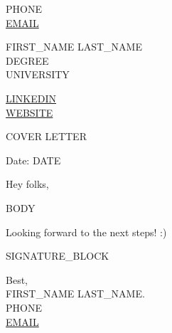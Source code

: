 \documentclass[12pt,a4paper]{article}
\begin{document}
\begin{center}
    \begin{minipage}[b]{0.24\textwidth}
            \large {{PHONE}} \\
            \large \href{mailto:{{EMAIL}}}{{{EMAIL}}}
    \end{minipage}%
    \begin{minipage}[b]{0.5\textwidth}
            \centering
            {\Huge {{FIRST_NAME}} {{LAST_NAME}}} \\ %
            \vspace{0.1cm}
            {\color{UI_blue} \large{{{DEGREE}} \\ {{UNIVERSITY}}}} \\
    \end{minipage}%
    \begin{minipage}[b]{0.24\textwidth}
            \flushright \large
            {\href{https://{{LINKEDIN}}}{{{LINKEDIN}}} } \\
            \href{https://{{WEBSITE}}}{{{WEBSITE}}}
    \end{minipage}

\vspace{-0.15cm}
{\color{UI_blue} \hrulefill}
\end{center}

\justify
\setlength{\parindent}{0pt}
\setlength{\parskip}{12pt}
\vspace{0.2cm}
\begin{center}
    {\color{UI_blue} \Large{COVER LETTER}}
\end{center}


\vspace{0.5cm}

Date: {{DATE}} \par \vspace{-0.1cm}

Hey folks,

{{BODY}}

Looking forward to the next steps! :)

{{SIGNATURE_BLOCK}}

\raggedright
Best, \\ {{FIRST_NAME}} {{LAST_NAME}}. \\ {{PHONE}} \\ \href{mailto:{{EMAIL}}}{{{EMAIL}}}
\label{LastPage}
\end{document}
